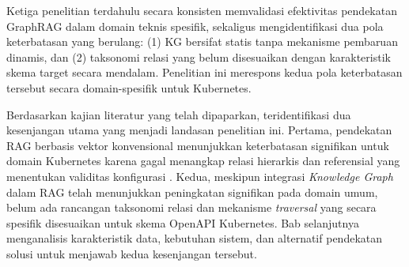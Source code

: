 Ketiga penelitian terdahulu secara konsisten memvalidasi efektivitas pendekatan GraphRAG dalam domain teknis spesifik, sekaligus mengidentifikasi dua pola keterbatasan yang berulang: (1) KG bersifat statis tanpa mekanisme pembaruan dinamis, dan (2) taksonomi relasi yang belum disesuaikan dengan karakteristik skema target secara mendalam. Penelitian ini merespons kedua pola keterbatasan tersebut secara domain-spesifik untuk Kubernetes.

Berdasarkan kajian literatur yang telah dipaparkan, teridentifikasi dua kesenjangan utama yang menjadi landasan penelitian ini. Pertama, pendekatan RAG berbasis vektor konvensional menunjukkan keterbatasan signifikan untuk domain Kubernetes karena gagal menangkap relasi hierarkis dan referensial yang menentukan validitas konfigurasi \parencite{wan2025empowering}. Kedua, meskipun integrasi \textit{Knowledge Graph} dalam RAG telah menunjukkan peningkatan signifikan pada domain umum, belum ada rancangan taksonomi relasi dan mekanisme \textit{traversal} yang secara spesifik disesuaikan untuk skema OpenAPI Kubernetes. Bab selanjutnya menganalisis karakteristik data, kebutuhan sistem, dan alternatif pendekatan solusi untuk menjawab kedua kesenjangan tersebut.
